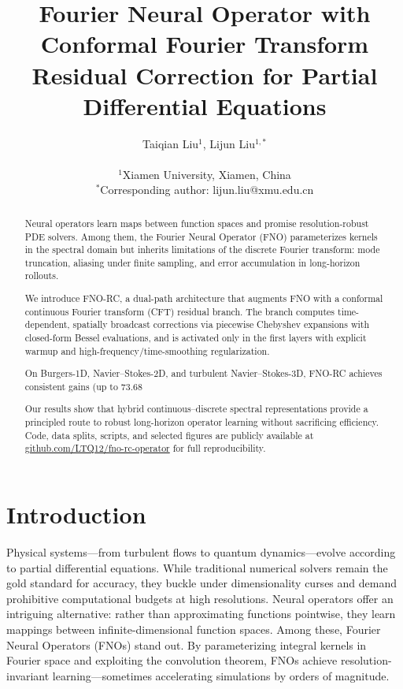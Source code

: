 \documentclass[11pt]{article}
\title{\textbf{Fourier Neural Operator with Conformal Fourier Transform Residual Correction for Partial Differential Equations}}
\author{
    Taiqian Liu$^{1}$, Lijun Liu$^{1,*}$ \\
    \\
    $^{1}$Xiamen University, Xiamen, China \\
    $^{*}$Corresponding author: lijun.liu@xmu.edu.cn
}
\date{}
\begin{document}
\maketitle

\begin{abstract}
Neural operators learn maps between function spaces and promise resolution-robust PDE solvers. Among them, the Fourier Neural Operator (FNO) parameterizes kernels in the spectral domain but inherits limitations of the discrete Fourier transform: mode truncation, aliasing under finite sampling, and error accumulation in long-horizon rollouts.

We introduce FNO-RC, a dual-path architecture that augments FNO with a conformal continuous Fourier transform (CFT) residual branch. The branch computes time-dependent, spatially broadcast corrections via piecewise Chebyshev expansions with closed-form Bessel evaluations, and is activated only in the first layers with explicit warmup and high-frequency/time-smoothing regularization.

On Burgers-1D, Navier–Stokes-2D, and turbulent Navier–Stokes-3D, FNO-RC achieves consistent gains (up to 73.68%

Our results show that hybrid continuous–discrete spectral representations provide a principled route to robust long-horizon operator learning without sacrificing efficiency. Code, data splits, scripts, and selected figures are publicly available at \href{https://github.com/LTQ12/fno-rc-operator}{github.com/LTQ12/fno-rc-operator} for full reproducibility.
\end{abstract}

\section{Introduction}

Physical systems—from turbulent flows to quantum dynamics—evolve according to partial differential equations. While traditional numerical solvers remain the gold standard for accuracy, they buckle under dimensionality curses and demand prohibitive computational budgets at high resolutions. Neural operators \citep{kovachki2021neural,lu2021learning} offer an intriguing alternative: rather than approximating functions pointwise, they learn mappings between infinite-dimensional function spaces. Among these, Fourier Neural Operators (FNOs) \citep{Li2020FNO} stand out. By parameterizing integral kernels in Fourier space and exploiting the convolution theorem, FNOs achieve resolution-invariant learning—sometimes accelerating simulations by orders of magnitude.
\end{document}

